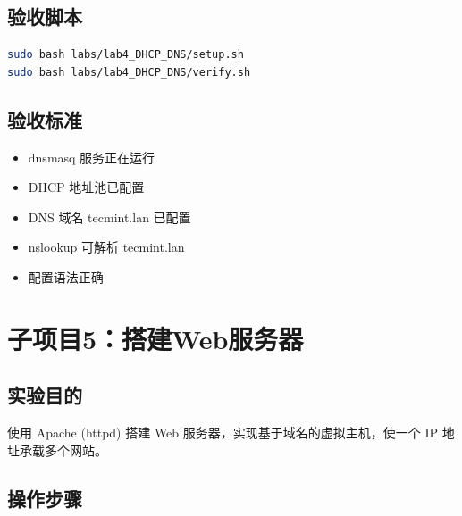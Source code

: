 \documentclass[12pt,a4paper]{ctexart}
\begin{document}
\subsection{验收脚本}

\begin{cmdbox}
\begin{lstlisting}[language=bash]
sudo bash labs/lab4_DHCP_DNS/setup.sh
sudo bash labs/lab4_DHCP_DNS/verify.sh
\end{lstlisting}
\end{cmdbox}

\subsection{验收标准}

\begin{itemize}
  \item dnsmasq 服务正在运行
  \item DHCP 地址池已配置
  \item DNS 域名 tecmint.lan 已配置
  \item nslookup 可解析 tecmint.lan
  \item 配置语法正确
\end{itemize}

\newpage
\section{子项目5：搭建Web服务器}

\subsection{实验目的}

使用 Apache (httpd) 搭建 Web 服务器，实现基于域名的虚拟主机，使一个 IP 地址承载多个网站。

\subsection{操作步骤}
\end{document}
